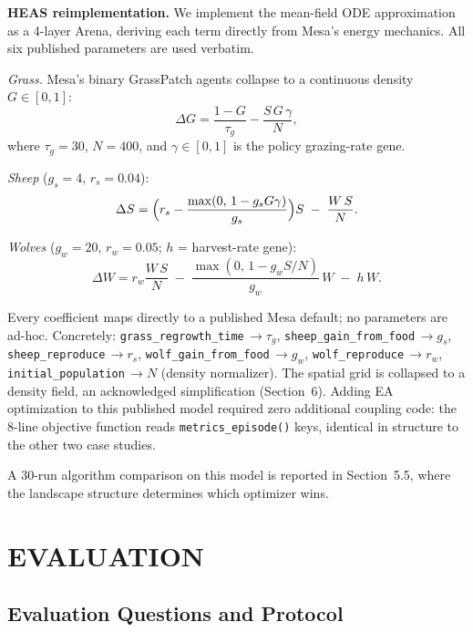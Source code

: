 \documentclass{wscpaperproc}
\begin{document}
\textbf{HEAS reimplementation.} We implement the mean-field ODE approximation as a
4-layer Arena, deriving each term directly from Mesa's energy mechanics.
All six published parameters are used verbatim.

\textit{Grass.} Mesa's binary GrassPatch agents collapse to a continuous
density $G\in[0,1]$:
\begin{equation}
  \Delta G = \frac{1-G}{\tau_g} - \frac{S\,G\,\gamma}{N},
  \label{eq:grass}
\end{equation}
where $\tau_g\!=\!30$, $N\!=\!400$, and $\gamma\!\in\![0,1]$ is the policy
grazing-rate gene.

\textit{Sheep} ($g_s\!=\!4$, $r_s\!=\!0.04$):
\begin{equation}
  \Delta S = \Bigl(r_s - \frac{\max(0,\,1-g_s G\gamma)}{g_s}\Bigr)S
             \;-\; \frac{W\,S}{N}.
  \label{eq:sheep}
\end{equation}

\textit{Wolves} ($g_w\!=\!20$, $r_w\!=\!0.05$; $h$ = harvest-rate gene):
\begin{equation}
  \Delta W = r_w \frac{W\,S}{N}
             \;-\; \frac{\max(0,\,1-g_w S/N)}{g_w}\,W
             \;-\; h\,W.
  \label{eq:wolf}
\end{equation}

Every coefficient maps directly to a published Mesa default; no parameters
are ad-hoc. Concretely: \texttt{grass\_regrowth\_time}\,$\to\!\tau_g$,
\texttt{sheep\_gain\_from\_food}\,$\to\!g_s$,
\texttt{sheep\_reproduce}\,$\to\!r_s$,
\texttt{wolf\_gain\_from\_food}\,$\to\!g_w$,
\texttt{wolf\_reproduce}\,$\to\!r_w$,
\texttt{initial\_population}\,$\to\!N$ (density normalizer). The spatial grid
is collapsed to a density field, an acknowledged simplification (Section~6).
Adding EA optimization to this published model required zero additional coupling
code: the 8-line objective function reads \texttt{metrics\_episode()} keys,
identical in structure to the other two case studies.

A 30-run algorithm comparison on this model is reported in Section~5.5,
where the landscape structure determines which optimizer wins.

\section{EVALUATION}

\subsection{Evaluation Questions and Protocol}
\end{document}
